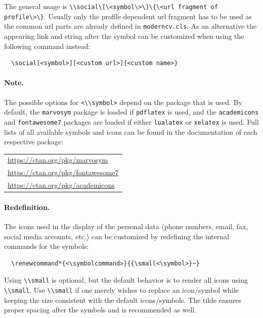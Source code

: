 \documentclass[a4paper, 11pt]{article}
\newcommand{\code}[1]{\lstinline!#1!}
\begin{document}
The general usage is \code{\\social\[\<symbol\>\]\{\<url fragment of profile\>\}}. Usually only the profile dependent url fragment has to be used as the common url parts are already defined in \texttt{moderncv.cls}.
As an alternative the appearing link and string after the symbol can be customized when using the following command instead:
\begin{lstlisting}
  \social[<symbol>][<custom url>]{<custom name>}
\end{lstlisting}

\paragraph{Note.}
The possible options for \code{<\\symbol>} depend on the package that is used.
By default, the \code{marvosym} package is loaded if \code{pdflatex} is used, and the \code{academicons} and \code{fontawesome7} packages are loaded if either \code{lualatex} or \code{xelatex} is used.
Full lists of all available symbols and icons can be found in the documentation of each respective package:

\begin{tabular}{l}
  \url{https://ctan.org/pkg/marvosym} \\[1ex]
  \url{https://ctan.org/pkg/fontawesome7} \\[1ex]
  \url{https://ctan.org/pkg/academicons}
\end{tabular}

\paragraph{Redefinition.}The icons used in the display of the personal data (phone numbers, email, fax, social media accounts, etc.) can be customized by redefining the internal commands for the symbols:
\begin{lstlisting}
  \renewcommand*{<\symbolcommand>}{{\small<\symbol>}~}
\end{lstlisting}
Using \code{\\small} is optional, but the default behavior is to render all icons using \code{\\small}.
Use \code{\\small} if one merely wishes to replace an icon/symbol while keeping the size consistent with the default icons/symbols.
The tilde ensures proper spacing after the symbols and is recommended as well.
\end{document}
